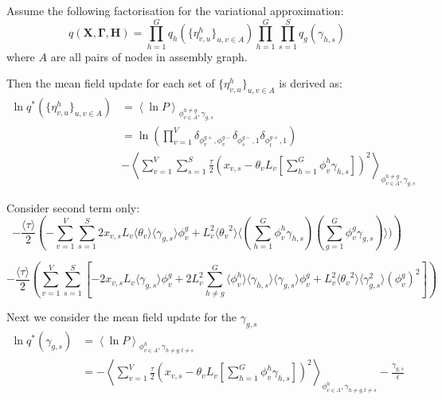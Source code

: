 \documentclass[10pt]{article}
\begin{document}
\noindent Assume the following factorisation for the variational approximation:
\begin{equation}
q(\mathbf{X},\mathbf{\Gamma},\mathbf{H})  =  \prod_{h=1}^G q_h(\{ \eta^h_{v,u} \} _{u,v \in A}) \prod_{h=1}^G \prod_{s=1}^S q_g(\gamma_{h,s})
\end{equation}
where $A$ are all pairs of nodes in assembly graph.

\noindent Then the mean field update for each set of $ \{\eta^h_{v,u}\}_{u,v \in A}$ is derived as:
\begin{align*}
\ln q^*( \{ \eta^h_{v,u} \} _{u,v \in A}) & =  \left\langle \ln P \right\rangle _{ \phi^{h \neq g}_{v \in A},\gamma_{g,s}} \\
& =  \ln \left( \prod_{v=1}^V \delta_{ \phi^{g+}_v, \phi^{g-}_v} \delta_{\phi^{g-}_s,1}  \delta_{\phi^{g+}_t,1} \right) \\
& - \left\langle \sum_{v=1}^V \sum_{s=1}^S \frac{\tau}{2} \left( x_{v,s} - \theta_v L_v[\sum_{h=1}^G \phi^h_v \gamma_{h,s}] \right)^2 \right\rangle _{ \phi^{h \neq g}_{v \in A},\gamma_{g,s}}
\end{align*}

\noindent Consider second term only:
\begin{equation*}
 - \frac{\langle \tau \rangle}{2}  \left ( 
- \sum_{v=1}^V \sum_{s=1}^S 2 x_{v,s} L_v \langle \theta_v \rangle \langle \gamma_{g,s} \rangle \phi^{g}_v
+ L_v^2 \langle {\theta_v}^2 \rangle \langle (\sum_{h=1}^G \phi^h_v \gamma_{h,s}) (\sum_{g=1}^G \phi^g_v \gamma_{g,s}) \rangle)
\right )
\end{equation*}

\begin{equation*}
 - \frac{\langle \tau \rangle}{2} \left ( 
 \sum_{v=1}^V \sum_{s=1}^S \left [ -2 x_{v,s} L_v \langle \gamma_{g,s} \rangle \phi^{g}_v
+ 2 L_v^ 2 \sum_{h \neq g }^G \langle \phi^h_v \rangle \langle \gamma_{h,s} \rangle \langle \gamma_{g,s} \rangle \phi^{g}_v
+ L_v^2  \langle {\theta_v}^2 \rangle \langle \gamma_{g,s}^2 \rangle (\phi^{g}_v)^2
\right]
\right )
\end{equation*}

\noindent Next we consider the mean field update for the $\gamma_{g,s}$
\begin{align*}
\ln q^*(\gamma_{g,s}) & =  \left\langle \ln P \right\rangle_{ \phi^{h}_{v \in A},\gamma_{h \neq g,t \neq s}} \\
& =  - \left\langle \sum_{v=1}^V \frac{\tau}{2}\left( x_{v,s} - \theta_v L_v[\sum_{h=1}^G \phi^h_v \gamma_{h,s}] \right)^2 \right\rangle _{\phi^{h}_{v \in A},\gamma_{h \neq g,t \neq s}} - \frac{\gamma_{g,s}}{\epsilon}
\end{align*}
\end{document}
